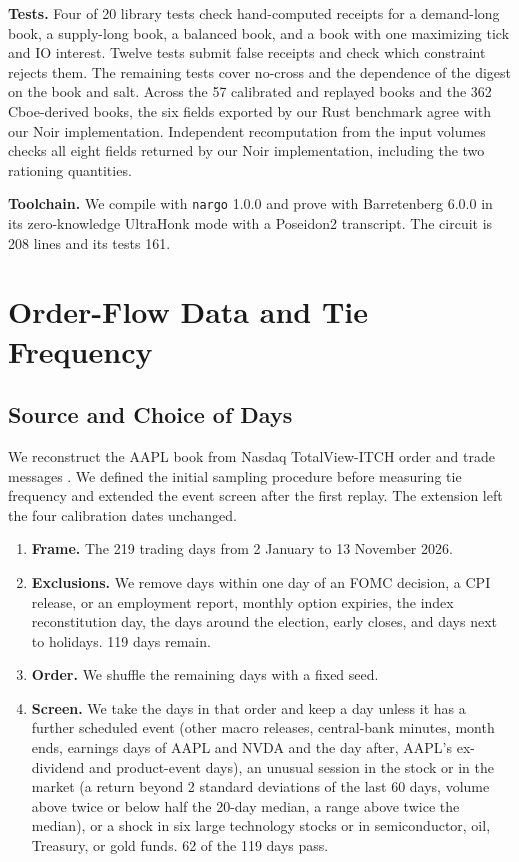 \textbf{Tests.} Four of 20 library tests check hand-computed receipts for a demand-long book, a supply-long book, a balanced book, and a book with one maximizing tick and IO interest. Twelve tests submit false receipts and check which constraint rejects them. The remaining tests cover no-cross and the dependence of the digest on the book and salt. Across the 57 calibrated and replayed books and the 362 Cboe-derived books, the six fields exported by our Rust benchmark agree with our Noir implementation. Independent recomputation from the input volumes checks all eight fields returned by our Noir implementation, including the two rationing quantities.

\textbf{Toolchain.} We compile with \texttt{nargo} 1.0.0 and prove with Barretenberg 6.0.0 in its zero-knowledge UltraHonk mode with a Poseidon2 transcript. The circuit is 208 lines and its tests 161.

\section{Order-Flow Data and Tie Frequency}
\label{app:zq-data}

\subsection{Source and Choice of Days}

We reconstruct the AAPL book from Nasdaq TotalView-ITCH order and trade messages \cite{itch}. We defined the initial sampling procedure before measuring tie frequency and extended the event screen after the first replay. The extension left the four calibration dates unchanged.

\begin{enumerate}
\item \textbf{Frame.} The 219 trading days from 2 January to 13 November 2026.
\item \textbf{Exclusions.} We remove days within one day of an FOMC decision, a CPI release, or an employment report, monthly option expiries, the index reconstitution day, the days around the election, early closes, and days next to holidays. 119 days remain.
\item \textbf{Order.} We shuffle the remaining days with a fixed seed.
\item \textbf{Screen.} We take the days in that order and keep a day unless it has a further scheduled event (other macro releases, central-bank minutes, month ends, earnings days of AAPL and NVDA and the day after, AAPL's ex-dividend and product-event days), an unusual session in the stock or in the market (a return beyond 2 standard deviations of the last 60 days, volume above twice or below half the 20-day median, a range above twice the median), or a shock in six large technology stocks or in semiconductor, oil, Treasury, or gold funds. 62 of the 119 days pass.
\end{enumerate}

